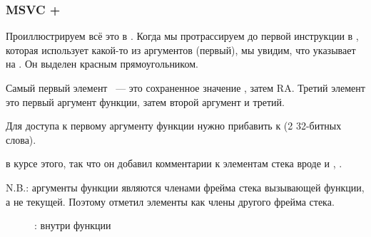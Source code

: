 \subsubsection{MSVC + \olly}
\myindex{\olly}
Проиллюстрируем всё это в \olly.
Когда мы протрассируем до первой инструкции в \ttf, которая использует какой-то из аргументов
(первый), мы увидим, что \EBP указывает на . Он выделен красным прямоугольником.

Самый первый элемент ~--- это сохраненное значение \EBP, 
затем \ac{RA}. Третий элемент это первый аргумент функции, затем второй аргумент и третий.

Для доступа к первому аргументу функции нужно прибавить к  (2 32-битных слова).

\olly в курсе этого, так что он добавил комментарии к элементам стека вроде
 и , \etc{}.

N.B.: аргументы функции являются членами фрейма стека вызывающей функции, а не текущей.
Поэтому \olly отметил элементы  как члены другого фрейма стека.

\begin{figure}[H]
\centering
{}
\caption{\olly: внутри функции \ttf{}}
\label{fig:passing_arguments_olly}
\end{figure}
